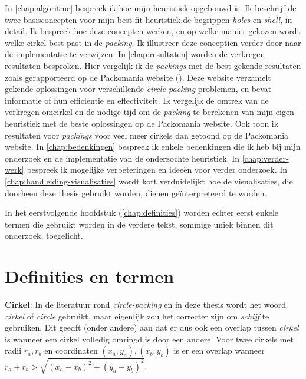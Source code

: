 \documentclass[12pt,a4paper,oneside]{book}
\begin{document}
In \autoref{chap:algoritme} bespreek ik hoe mijn heuristiek opgebouwd is.
Ik beschrijf de twee basisconcepten voor mijn best-fit heuristiek,de begrippen \textit{holes} en \textit{shell}, in detail.
Ik bespreek hoe deze concepten werken, en op welke manier gekozen wordt welke cirkel best past in de \textit{packing}.
Ik illustreer deze conceptien verder door naar de implementatie te verwijzen.
In \autoref{chap:resultaten} worden de verkregen resultaten besproken.
Hier vergelijk ik de \textit{packings} met de best gekende resultaten zoals gerapporteerd op de Packomania website (\cite{packomania}).
Deze website verzamelt gekende oplossingen voor verschillende \textit{circle-packing} problemen, en bevat informatie of hun efficientie en effectiviteit.
Ik vergelijk de omtrek van de verkregen omcirkel en de nodige tijd om de \textit{packing} te berekenen van mijn eigen heuristiek met de beste oplossingen op de Packomania website.
Ook toon ik resultaten voor \textit{packings} voor veel meer cirkels dan getoond op de Packomania website.
In \autoref{chap:bedenkingen} bespreek ik enkele bedenkingen die ik heb bij mijn onderzoek en de implementatie van de onderzochte heuristiek.
In \autoref{chap:verder-werk} bespreek ik mogelijke verbeteringen en ideeën voor verder onderzoek.
In \autoref{chap:handleiding-visualisaties} wordt kort verduidelijkt hoe de visualisaties, die doorheen deze thesis gebruikt worden, dienen geïnterpreteerd te worden.

In het eerstvolgende hoofdstuk (\autoref{chap:definities}) worden echter eerst enkele termen die gebruikt worden in de verdere tekst, sommige uniek binnen  dit onderzoek, toegelicht. %


\chapter{Definities en termen} \label{chap:definities}

\textbf{Cirkel}: In de literatuur rond \textit{circle-packing} en in deze thesis wordt het woord \textit{cirkel} of \textit{circle} gebruikt, maar eigenlijk zou het correcter zijn om \textit{schijf} te gebruiken. Dit geedft (onder andere) aan dat er dus ook een overlap tussen \textit{cirkel} is wanneer een cirkel volledig omringd is door een andere. 
Voor twee cirkels met radii $r_a, r_b$ en coordinaten  $(x_a,y_a), (x_b,y_b)$ is er een overlap wanneer $r_a + r_b > \sqrt{(x_a-x_b)^2 + (y_a-y_b)^2}$. 
\end{document}
